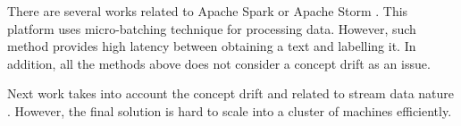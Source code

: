 

There are several works related to Apache Spark \cite{semberecki2016distributed} \cite{8029336} \cite{Nodarakis2016LargeSS} \cite{baltas2016apache} \cite{svyatkovskiy2016large} or Apache Storm \cite{khumoyun2016real}. This platform uses micro-batching technique for processing data. However, such method provides high latency between obtaining a text and labelling it. In addition, all the methods above does not consider a concept drift as an issue.

Next work takes into account the concept drift and related to stream data nature \cite{zhang2008one}. However, the final solution is hard to scale into a cluster of machines efficiently.